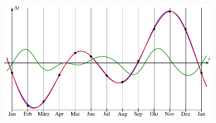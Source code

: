 \begin{loesung}
\begin{figure}
\centering
\includegraphics{chapters/6/zeitgl.pdf}

\end{figure}
\end{loesung}
